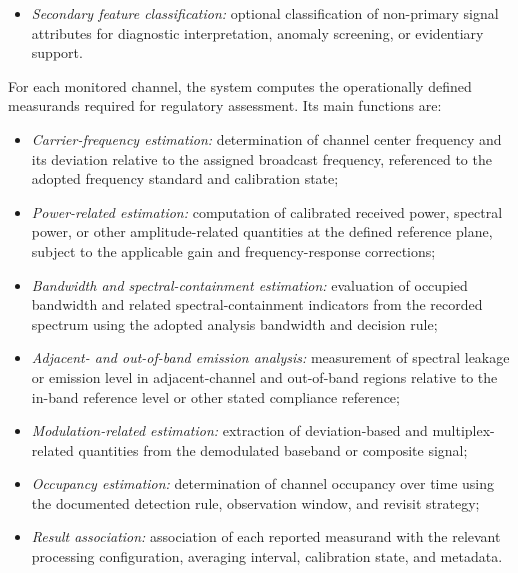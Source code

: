 \documentclass[11pt]{report}
\begin{document}
\begin{description}
\begin{itemize}
		\item \textit{Secondary feature classification:} optional classification of non-primary signal attributes for diagnostic interpretation, anomaly screening, or evidentiary support.
	\end{itemize}
	
	\item[Compliance Measurand Estimation:]
	For each monitored channel, the system computes the operationally defined measurands required for regulatory assessment. Its main functions are:
	\begin{itemize}
		\item \textit{Carrier-frequency estimation:} determination of channel center frequency and its deviation relative to the assigned broadcast frequency, referenced to the adopted frequency standard and calibration state;
		
		\item \textit{Power-related estimation:} computation of calibrated received power, spectral power, or other amplitude-related quantities at the defined reference plane, subject to the applicable gain and frequency-response corrections;
		
		\item \textit{Bandwidth and spectral-containment estimation:} evaluation of occupied bandwidth and related spectral-containment indicators from the recorded spectrum using the adopted analysis bandwidth and decision rule;
		
		\item \textit{Adjacent- and out-of-band emission analysis:} measurement of spectral leakage or emission level in adjacent-channel and out-of-band regions relative to the in-band reference level or other stated compliance reference;
		
		\item \textit{Modulation-related estimation:} extraction of deviation-based and multiplex-related quantities from the demodulated baseband or composite signal;
		
		\item \textit{Occupancy estimation:} determination of channel occupancy over time using the documented detection rule, observation window, and revisit strategy;
		
		\item \textit{Result association:} association of each reported measurand with the relevant processing configuration, averaging interval, calibration state, and metadata.
	\end{itemize}
	

\end{description}
\end{document}
